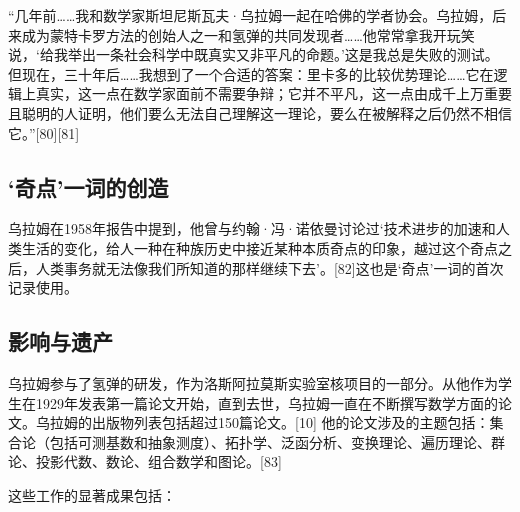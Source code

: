 “几年前……我和数学家斯坦尼斯瓦夫·乌拉姆一起在哈佛的学者协会。乌拉姆，后来成为蒙特卡罗方法的创始人之一和氢弹的共同发现者……他常常拿我开玩笑说，‘给我举出一条社会科学中既真实又非平凡的命题。’这是我总是失败的测试。但现在，三十年后……我想到了一个合适的答案：里卡多的比较优势理论……它在逻辑上真实，这一点在数学家面前不需要争辩；它并不平凡，这一点由成千上万重要且聪明的人证明，他们要么无法自己理解这一理论，要么在被解释之后仍然不相信它。”[80][81]
\subsection{‘奇点’一词的创造}  
乌拉姆在1958年报告中提到，他曾与约翰·冯·诺依曼讨论过‘技术进步的加速和人类生活的变化，给人一种在种族历史中接近某种本质奇点的印象，越过这个奇点之后，人类事务就无法像我们所知道的那样继续下去’。[82]这也是‘奇点’一词的首次记录使用。
\subsection{影响与遗产}  
乌拉姆参与了氢弹的研发，作为洛斯阿拉莫斯实验室核项目的一部分。从他作为学生在1929年发表第一篇论文开始，直到去世，乌拉姆一直在不断撰写数学方面的论文。乌拉姆的出版物列表包括超过150篇论文。[10] 他的论文涉及的主题包括：集合论（包括可测基数和抽象测度）、拓扑学、泛函分析、变换理论、遍历理论、群论、投影代数、数论、组合数学和图论。[83]

这些工作的显著成果包括：